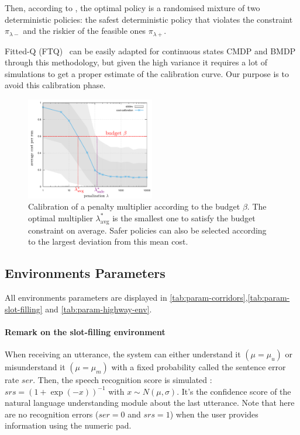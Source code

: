 Then, according to \citet[Theorem 4.4]{BEUTLER1985236}, the optimal policy is a randomised mixture of two deterministic policies: the safest deterministic policy that violates the constraint $\pi_{\lambda-}$ and the riskier of the feasible ones $\pi_{\lambda+}$.

Fitted-Q (FTQ)~\citep{Ernst2005,Riedmiller2005} can be easily adapted for continuous states CMDP and BMDP through this methodology, but given the high variance it requires a lot of simulations to get a proper estimate of the calibration curve. Our purpose is to avoid this calibration phase.

\begin{figure}[tp]
    \centering
    \includegraphics[width=0.5\textwidth]{source/img/CalibrationExample}
    \caption{Calibration of a penalty multiplier according to the budget $\beta$. The optimal multiplier $\lambda^*_{\text{avg}}$ is the smallest one to satisfy the budget constraint on average. Safer policies can also be selected according to the largest deviation from this mean cost.}
    \label{fig:Lagrangian}
\end{figure}

\subsection{Environments Parameters}
\label{sec:env-parameters}

All environments parameters are displayed in \cref{tab:param-corridors},\cref{tab:param-slot-filling} and \cref{tab:param-highway-env}.

\paragraph{Remark on the slot-filling environment} When receiving an utterance, the system can either understand it $(\mu=\mu_u)$ or misunderstand it $(\mu=\mu_m)$ with a fixed probability called the sentence error rate $ser$. Then, the speech recognition score is simulated \citep{Khouzaimi2015}: $srs = (1+\exp(-x))^{-1}$ with $x\sim N(\mu, \sigma)$. It's the confidence score of the natural language understanding module about the last utterance. Note that here are no recognition errors ($ser=0$ and $srs=1$) when the user provides information using the numeric pad.

